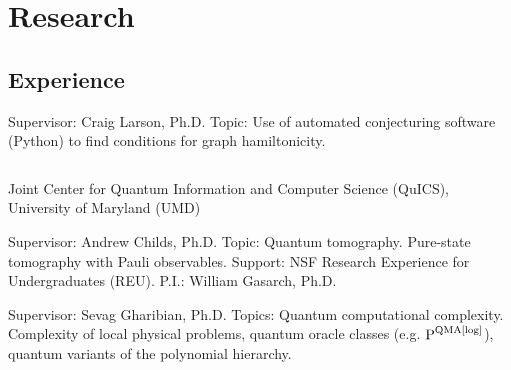 \documentclass[11pt,letterpaper,serif]{moderncv}
\begin{document}

\section{Research}
\subsection{Experience}
{	
	\begin{adjustwidth}{.25in}{}
		Supervisor: Craig Larson, Ph.D. \newline
		Topic: Use of automated conjecturing software (Python) to find conditions for graph hamiltonicity.
	\end{adjustwidth}
}

{
	$\!$\begin{minipage}{0.8\textwidth}
		Joint Center for Quantum Information and Computer Science (QuICS), \newline
		University of Maryland (UMD)	
	\end{minipage}
}
{}{}
{	
	\begin{adjustwidth}{.25in}{}
		Supervisor: Andrew Childs, Ph.D. \newline
		Topic: Quantum tomography. Pure-state tomography with Pauli observables. \newline
		Support: NSF Research Experience for Undergraduates (REU). P.I.: William Gasarch, Ph.D.
	\end{adjustwidth}
}

{
	\begin{adjustwidth}{.25in}{}
		Supervisor: Sevag Gharibian, Ph.D. \newline
		Topics: Quantum computational complexity. Complexity of local physical problems, quantum oracle classes (e.g. $\textup{P}^{\textup{QMA[log]}}$), quantum variants of the polynomial hierarchy.
	\end{adjustwidth}
}
\end{document}
